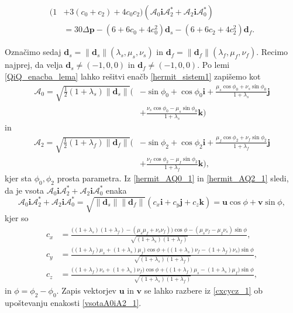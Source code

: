 \documentclass[12pt,a4paper,twoside]{article}
\theoremstyle{definition} %
\theoremstyle{plain} %
\theoremstyle{primerstyle}
\numberwithin{equation}{section}  %
\newcommand{\dV}{\mathbf{d}}
\newcommand{\pV}{\mathbf{p}}
\newcommand{\iV}{\mathbf{i}}
\newcommand{\jV}{\mathbf{j}}
\newcommand{\kV}{\mathbf{k}}
\newcommand{\uV}{\mathbf{u}}
\newcommand{\vV}{\mathbf{v}}
\newcommand{\AQ}{\mathcal{A}}
\begin{document}
\begin{align}
	\label{hermit_sistem3}
	(1&+3(c_0+c_2)+4c_0c_2)(\AQ_0\iV\AQ_2^*+\AQ_2\iV\AQ_0^*)\nonumber\\
	&=30\Delta\pV-(6+6c_0+4c_0^2)\dV_s-(6+6c_2+4c_2^2)\dV_f.
\end{align}

Označimo sedaj $\dV_s=\lVert\dV_s\rVert(\lambda_s,\mu_s,\nu_s)$ in $\dV_f=\lVert\dV_f\rVert(\lambda_f,\mu_f,\nu_f).$ Recimo najprej, da velja $\dV_s\neq(-1,0,0)$ in $\dV_f\neq(-1,0,0).$ Po lemi \ref{QiQ_enacba_lema} lahko rešitvi enačb \eqref{hermit_sistem1} zapišemo kot
\begin{align}
	\label{hermit_AQ0_1}
	\AQ_0=\sqrt{\frac{1}{2}(1+\lambda_s)\lVert\dV_s\rVert}\Big(&-\sin\phi_0+\cos\phi_0\iV+\frac{\mu_s\cos\phi_0+\nu_s\sin\phi_0}{1+\lambda_s}\jV\nonumber\\
		&+\frac{\nu_s\cos\phi_0-\mu_s\sin\phi_0}{1+\lambda_s}\kV\Big)
\end{align}
in
\begin{align}
	\label{hermit_AQ2_1}
	\AQ_2=\sqrt{\frac{1}{2}(1+\lambda_f)\lVert\dV_f\rVert}\Big(&-\sin\phi_2+\cos\phi_2\iV+\frac{\mu_f\cos\phi_2+\nu_f\sin\phi_2}{1+\lambda_f}\jV\nonumber\\
		&+\frac{\nu_f\cos\phi_2-\mu_f\sin\phi_2}{1+\lambda_f}\kV\Big),
\end{align}
kjer sta $\phi_0,\phi_2$ prosta parametra. %
Iz \eqref{hermit_AQ0_1} in \eqref{hermit_AQ2_1} sledi, da je vsota $\AQ_0\iV\AQ_2^*+\AQ_2\iV\AQ_0^*$ enaka
\begin{equation}
	\label{vsotaA0iA2_1}
	\AQ_0\iV\AQ_2^*+\AQ_2\iV\AQ_0^*=\sqrt{\lVert\dV_s\rVert\lVert\dV_f\rVert}(c_x\iV+c_y\jV+c_z\kV)=\uV\cos\phi+\vV\sin\phi,
\end{equation}
kjer so
\begin{align}
	\label{cxcycz_1}
	c_x&=\frac{\big((1+\lambda_s)(1+\lambda_f)-(\mu_s\mu_f+\nu_s\nu_f)\big)\cos\phi-(\mu_s\nu_f-\mu_f\nu_s)\sin\phi}{\sqrt{(1+\lambda_s)(1+\lambda_f)}},\nonumber\\
	c_y&=\frac{\big((1+\lambda_f)\mu_s+(1+\lambda_s)\mu_f\big)\cos\phi+\big((1+\lambda_s)\nu_f-(1+\lambda_f)\nu_s\big)\sin\phi}{\sqrt{(1+\lambda_s)(1+\lambda_f)}},\\
	c_z&=\frac{\big((1+\lambda_f)\nu_s+(1+\lambda_s)\nu_f\big)\cos\phi+\big((1+\lambda_f)\mu_s-(1+\lambda_s)\mu_f\big)\sin\phi}{\sqrt{(1+\lambda_s)(1+\lambda_f)}},\nonumber
\end{align}
in $\phi=\phi_2-\phi_0.$ Zapis vektorjev $\uV$ in $\vV$ se lahko razbere iz \eqref{cxcycz_1} ob upoštevanju enakosti \eqref{vsotaA0iA2_1}.
\end{document}
